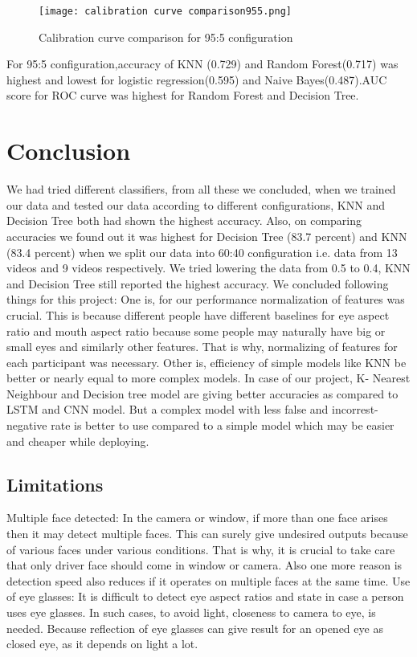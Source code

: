 \documentclass{article}
\begin{document}
\begin{figure}[H]
\centering
\texttt{[image: calibration curve comparison955.png]}
\caption {Calibration curve comparison for 95:5 configuration}
\label{fig-name}
\end{figure}

For 95:5 configuration,accuracy of KNN (0.729) and Random Forest(0.717) was highest and lowest for logistic regression(0.595) and Naive Bayes(0.487).AUC score for ROC curve was highest for Random Forest and Decision Tree.
\newpage
\section{Conclusion}
We had tried different classifiers, from all these we concluded, when we trained our data and tested our data according to different configurations, KNN and Decision Tree both had shown the highest accuracy. Also, on comparing accuracies we found out it was highest for Decision Tree (83.7 percent) and KNN (83.4 percent) when we split our data into 60:40 configuration i.e. data from 13 videos and 9 videos respectively. We tried lowering the data from 0.5 to 0.4, KNN and Decision Tree still reported the highest accuracy.
We concluded following things for this project:
One is, for our performance normalization of features was crucial. This is because different people have different baselines for eye aspect ratio and mouth aspect ratio because some people may naturally have big or small eyes and similarly other features. That is why, normalizing of features for each participant was necessary.
Other is, efficiency of simple models like KNN be better or nearly equal to more complex models. In case of our project, K- Nearest Neighbour and Decision tree model are giving better accuracies as compared to LSTM and CNN model. But a complex model with less false and incorrest-negative rate is better to use compared to a simple model which may be easier and cheaper while deploying.




\subsection{Limitations}
Multiple face detected:
In the camera or window, if more than one face arises then it may detect multiple faces. This can surely give undesired outputs because of various faces under various conditions. That is why, it is crucial to take care that only driver face should come in window or camera. Also one more reason is detection speed also reduces if it operates on multiple faces at the same time.
\newline Use of eye glasses:
It is difficult to detect eye aspect ratios and state in case a person uses eye glasses. In such cases, to avoid light, closeness to camera to eye, is needed. Because reflection of eye glasses can give result for an opened eye as closed eye, as it depends on light a lot.
\end{document}
